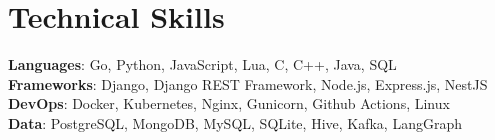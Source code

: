 \documentclass[letterpaper,11pt]{article}
\newcommand{\resumeSubHeadingListStart}{\begin{itemize}[leftmargin=0.15in, label={}]}
\newcommand{\resumeSubHeadingListEnd}{\end{itemize}}
\begin{document}
\section{Technical Skills}
\begin{itemize}[leftmargin=0.15in, label={}]
  {\item{
    \textbf{Languages}{: Go, Python, JavaScript, Lua, C, C++, Java, SQL} \\
    \textbf{Frameworks}{: Django, Django REST Framework, Node.js, Express.js, NestJS} \\
    \textbf{DevOps}{: Docker, Kubernetes, Nginx, Gunicorn, Github Actions, Linux} \\
    \textbf{Data}{: PostgreSQL, MongoDB, MySQL, SQLite, Hive, Kafka, LangGraph} \\
  }}
\end{itemize}

%


\end{document}
